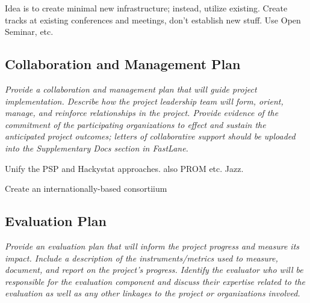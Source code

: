 Idea is to create minimal new infrastructure; instead, utilize existing.  Create tracks at existing conferences and meetings, don't establish new stuff.  Use Open Seminar, etc. 


\subsection{Collaboration and Management Plan}

{\em Provide a collaboration and management plan that will guide project implementation.  Describe how the project leadership team will form, orient, manage, and reinforce relationships in the project.  Provide evidence of the commitment of the participating organizations to effect and sustain the anticipated project outcomes; letters of collaborative support should be uploaded into the Supplementary Docs section in FastLane. }

Unify the PSP and Hackystat approaches. also PROM etc. Jazz. 

Create an internationally-based consortiium

\subsection{Evaluation Plan}

{\em Provide an evaluation plan that will inform the project progress and measure its impact.  Include a description of the instruments/metrics used to measure, document, and report on the project's progress.  Identify the evaluator who will be responsible for the evaluation component and discuss their expertise related to the evaluation as well as any other linkages to the project or organizations involved.  }






